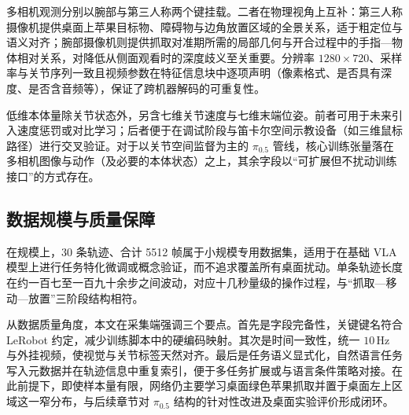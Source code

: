 多相机观测分别以腕部与第三人称两个键挂载。二者在物理视角上互补：第三人称摄像机提供桌面上苹果目标物、障碍物与边角放置区域的全景关系，适于粗定位与语义对齐；腕部摄像机则提供抓取对准期所需的局部几何与开合过程中的手指—物体相对关系，对降低从侧面观看时的深度歧义至关重要。分辨率 $1280{\times}720$、采样率与关节序列一致且视频参数在特征信息块中逐项声明（像素格式、是否具有深度、是否含音频等），保证了跨机器解码的可重复性。

低维本体量除关节状态外，另含七维关节速度与七维末端位姿。前者可用于未来引入速度惩罚或对比学习；后者便于在调试阶段与笛卡尔空间示教设备（如三维鼠标路径）进行交叉验证。对于以关节空间监督为主的 $\pi_{0.5}$ 管线，核心训练张量落在多相机图像与动作（及必要的本体状态）之上，其余字段以“可扩展但不扰动训练接口”的方式存在。

\subsection{数据规模与质量保障}
\label{sec:scale-quality}

在规模上，30 条轨迹、合计 5512 帧属于小规模专用数据集，适用于在基础 VLA 模型上进行任务特化微调或概念验证，而不追求覆盖所有桌面扰动。单条轨迹长度在约一百七至一百九十余步之间波动，对应十几秒量级的操作过程，与“抓取—移动—放置”三阶段结构相符。

从数据质量角度，本文在采集端强调三个要点。首先是字段完备性，关键键名符合 LeRobot 约定，减少训练脚本中的硬编码映射。其次是时间一致性，统一 $10\,\mathrm{Hz}$ 与外挂视频，使视觉与关节标签天然对齐。最后是任务语义显式化，自然语言任务写入元数据并在轨迹信息中重复索引，便于多任务扩展或与语言条件策略对接。在此前提下，即使样本量有限，网络仍主要学习桌面绿色苹果抓取并置于桌面左上区域这一窄分布，与后续章节对 $\pi_{0.5}$ 结构的针对性改进及桌面实验评价形成闭环。

